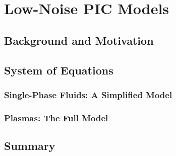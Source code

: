\chapter{Low-Noise PIC Models}

    \section{Background and Motivation}
    \section{System of Equations}
        \subsection*{Single-Phase Fluids: A Simplified Model}
        \subsection*{Plasmas: The Full Model}
    
    \section*{Summary}
